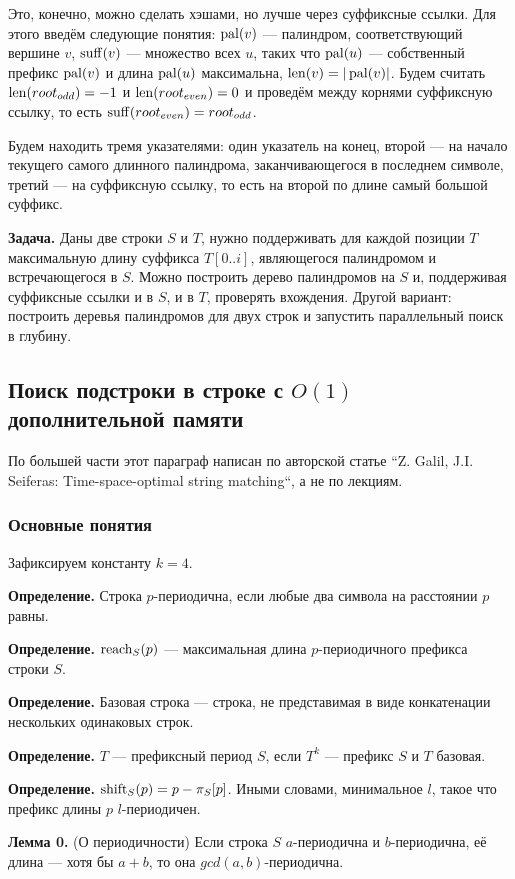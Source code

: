 Это, конечно, можно сделать хэшами, но лучше через суффиксные ссылки. Для этого введём следующие понятия: $\operatorname{pal}(v)$ --- палиндром, соответствующий вершине $v$, $\operatorname{suff}(v)$ --- множество всех $u$, таких что $\operatorname{pal}(u)$ --- собственный префикс $\operatorname{pal}(v)$ и длина $\operatorname{pal}(u)$ максимальна, $\operatorname{len}(v) = |\operatorname{pal}(v)|$.
Будем считать $\operatorname{len}(root_{odd}) = -1$ и $\operatorname{len}(root_{even}) = 0$ и проведём между корнями суффиксную ссылку, то есть $\operatorname{suff}(root_{even}) = root_{odd}$.

Будем находить тремя указателями: один указатель на конец, второй --- на начало текущего самого длинного палиндрома, заканчивающегося в последнем символе, третий --- на суффиксную ссылку, то есть на второй по длине самый большой суффикс.

\textbf{Задача.} Даны две строки $S$ и $T$, нужно поддерживать для каждой позиции $T$ максимальную длину суффикса $T[0..i]$, являющегося палиндромом и встречающегося в $S$.
Можно построить дерево палиндромов на $S$ и, поддерживая суффиксные ссылки и в $S$, и в $T$, проверять вхождения.
Другой вариант: построить деревья палиндромов для двух строк и запустить параллельный поиск в глубину.

\subsection{Поиск подстроки в строке с $O(1)$ дополнительной памяти}
По большей части этот параграф написан по авторской статье ``Z. Galil, J.I. Seiferas: Time-space-optimal string matching``, а не по лекциям.
\subsubsection{Основные понятия}
Зафиксируем константу $k = 4$.

\textbf{Определение.} Строка $p$-периодична, если любые два символа на расстоянии $p$ равны.

\textbf{Определение.} $\operatorname{reach}_S(p)$ --- максимальная длина $p$-периодичного префикса строки $S$.

\textbf{Определение.} Базовая строка --- строка, не представимая в виде конкатенации нескольких одинаковых строк.

\textbf{Определение.} $T$ --- префиксный период $S$, если $T^k$ --- префикс $S$ и $T$ базовая.

\textbf{Определение.} $\operatorname{shift}_S(p) = p - \pi_S[p]$. Иными словами, минимальное $l$, такое что префикс длины $p$ $l$-периодичен.

\sloppy \textbf{Лемма 0.} (О периодичности) Если строка $S$ $a$-периодична и $b$-периодична, её длина --- хотя бы $a + b$, то она $gcd(a, b)$-периодична.

